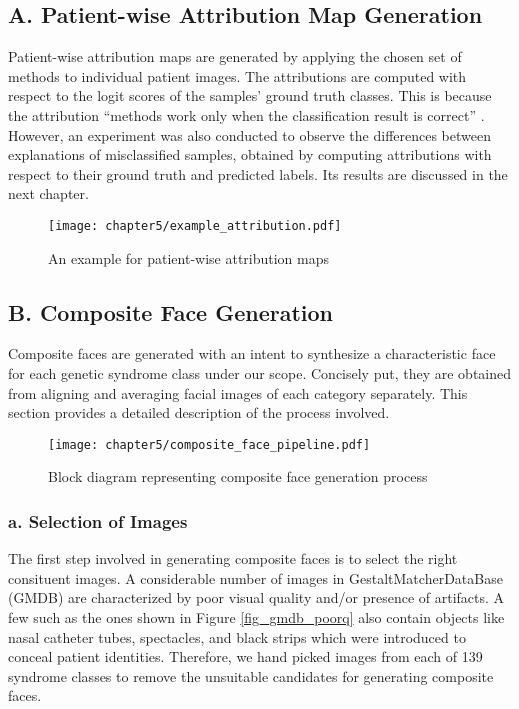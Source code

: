 \documentclass[../report.tex]{subfiles}
\begin{document}
    \subsection{A. Patient-wise Attribution Map Generation}
    Patient-wise attribution maps are generated by applying the chosen set of methods to individual patient images. The attributions are computed with respect to the logit scores of the samples' ground truth classes. This is because the attribution \enquote{methods work only when the classification result is correct} \cite{muhammad2020eigen}. However, an experiment was also conducted to observe the differences between explanations of misclassified samples, obtained by computing attributions with respect to their ground truth and predicted labels. Its results are discussed in the next chapter.
    \begin{figure}[H]
    	\hspace*{0cm}      
    	\texttt{[image: chapter5/example\_attribution.pdf]}
    	\caption{An example for patient-wise attribution maps}
    	\label{fig_gm_pipeline}
    \end{figure}
    \subsection{B. Composite Face Generation}\label{sec_cface_gen}
    Composite faces are generated with an intent to synthesize a characteristic face for each genetic syndrome class under our scope. Concisely put, they are obtained from aligning and averaging facial images of each category separately. This section provides a detailed description of the process involved.
       \begin{figure}[H]
    	\hspace*{-0.5cm}      
    	\texttt{[image: chapter5/composite\_face\_pipeline.pdf]}
    	\caption{Block diagram representing composite face generation process}
    	\label{fig_gm_pipeline}
    \end{figure}
    
    \subsubsection{a. Selection of Images}
    The first step involved in generating composite faces is to select the right consituent images. A considerable number of images in GestaltMatcherDataBase (GMDB) are characterized by poor visual quality and/or presence of artifacts. A few such as the ones shown in Figure \ref{fig_gmdb_poorq} also contain objects like nasal catheter tubes, spectacles, and black strips which were introduced to conceal patient identities. Therefore, we hand picked images from each of 139 syndrome classes to remove the unsuitable candidates for generating composite faces.
    
\end{document}
